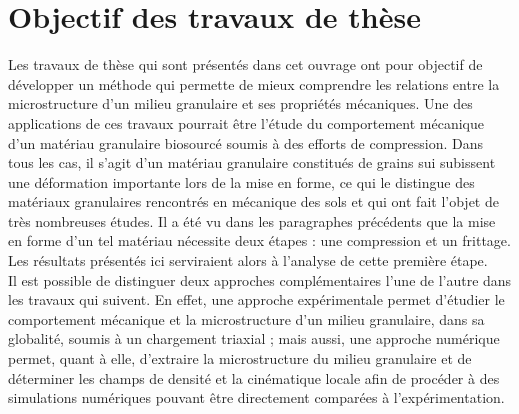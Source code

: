 \section*{Objectif des travaux de thèse}
Les travaux de thèse qui sont présentés dans cet ouvrage ont pour objectif de développer un méthode qui permette de mieux comprendre les relations entre la microstructure d'un milieu granulaire et ses propriétés mécaniques. Une des applications de ces travaux pourrait être l'étude du comportement mécanique d'un matériau granulaire biosourcé soumis à des efforts de compression. Dans tous les cas, il s'agit d'un matériau granulaire constitués de grains sui subissent une déformation importante lors de la mise en forme, ce qui le distingue des matériaux granulaires rencontrés en mécanique des sols et qui ont fait l'objet de très nombreuses études. Il a été vu dans les paragraphes précédents que la mise en forme d'un tel matériau nécessite deux étapes : une compression et un frittage. Les résultats présentés ici serviraient alors à l'analyse de cette première étape.
\\Il est possible de distinguer deux approches complémentaires l'une de l'autre dans les travaux qui suivent. En effet, une approche expérimentale permet d'étudier le comportement mécanique et la microstructure d'un milieu granulaire, dans sa globalité, soumis à un chargement triaxial ; mais aussi, une approche numérique permet, quant à elle, d'extraire la microstructure du milieu granulaire et de déterminer les champs de densité et la cinématique locale afin de procéder à des simulations numériques pouvant être directement comparées à l'expérimentation.
